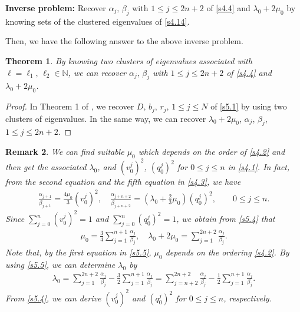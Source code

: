 \documentclass[a4paper,12pt]{article}
\newtheorem{Th}{Theorem}[section]
\newtheorem{remark}[Th]{Remark}
\newtheorem{a priori condition}[Th]{A priori condition}
\begin{document}
\medskip
\noindent
{\bf Inverse problem:} Recover $\alpha_j,\, \beta_j$ with $1\le j\le 2n+2$ of \eqref{s4.4} and $\lambda_0+2\mu_0$ by knowing sets of the clustered eigenvalues of \eqref{s4.14}.

\medskip
Then, we have the following answer to the above inverse problem.
\begin{Th}\label{s_thm5.2}
By knowing two clusters of eigenvalues associated with $\ell=\ell_1,\,\ell_2\in{\mathbb N}$, we can recover $\alpha_j,\, \beta_j$ with $1\le j\le 2n+2$ of \eqref{s4.4} and $\lambda_0+2\mu_0$. 
\end{Th}
\begin{proof}
In Theorem 1 of \cite{CDDLN2},  we recover $D,\,b_j,\,r_j$, $1\leq j\leq N$ of \eqref{s5.1} by using two clusters of eigenvalues. In the same way, we can recover $\lambda_0+2\mu_0$, $\alpha_j$, $\beta_j$, $1\leq j\leq 2n+2$.
\end{proof}


\begin{remark}
We can find suitable $\mu_0$ which depends on the order of \eqref{s4.2} and then get the associated $\lambda_0$, and $(v_0^j)^2$, $(q_0^j)^2$ for $0\leq j \leq n$ in \eqref{s4.1}. In fact, from the second equation and the fifth equation in \eqref{s4.3}, we have 
\begin{equation}\label{s5.4}
\begin{aligned}
\frac{\alpha_{j+1}}{\beta_{j+1}}=\frac{4\mu_0}{3}(v_0^j)^2,\quad \frac{\alpha_{j+n+2}}{\beta_{j+n+2}}=(\lambda_0+\frac{2}{3}\mu_0)(q_0^j)^2,\qquad 0\leq j \leq n.
\end{aligned}
\end{equation}
Since $ \sum_{j=0}^{n}(v_0^j)^2=1 $ and $ \sum_{j=0}^{n}(q_0^j)^2=1 $, we obtain from \eqref{s5.4} that
\begin{equation}\label{s5.5}
\begin{aligned}
\mu_0=\frac{3}{4}\sum_{j=1}^{n+1}\frac{\alpha_{j}}{\beta_{j}},\quad \lambda_0+2\mu_0=\sum_{j=1}^{2n+2}\frac{\alpha_{j}}{\beta_{j}}.
\end{aligned}
\end{equation}
Note that, by the first equation in \eqref{s5.5}, $\mu_0$ depends on the ordering \eqref{s4.2}.
By using \eqref{s5.5}, we can determine $\lambda_0$ by
\begin{equation}\label{s5.6}
\begin{aligned}
\lambda_0=\sum_{j=1}^{2n+2}\frac{\alpha_{j}}{\beta_{j}}-\frac{3}{2}\sum_{j=1}^{n+1}\frac{\alpha_{j}}{\beta_{j}}=\sum_{j=n+2}^{2n+2}\frac{\alpha_{j}}{\beta_{j}}-\frac{1}{2}\sum_{j=1}^{n+1}\frac{\alpha_{j}}{\beta_{j}}.
\end{aligned}
\end{equation}
From \eqref{s5.4}, we can derive $(v_0^j)^2$ and $(q_0^j)^2$ for $0\leq j \leq n$, respectively. 
\end{remark}
    
\end{document}
